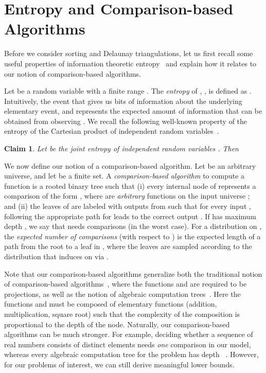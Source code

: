 \documentclass{siamltex}
\newtheorem{claim}[theorem]{Claim}
\begin{document}
\section{Entropy and Comparison-based Algorithms}\label{sec:entropy}

Before we consider sorting and Delaunay triangulations, let us first recall 
some 
useful properties of information theoretic entropy~\cite{CoverTh06} and 
explain how it relates to our notion of comparison-based algorithms.

Let  be a random variable with a finite range . The 
\emph{entropy} of , , is defined as 
.
Intuitively, the event that  gives us 
 bits of information about the underlying
elementary event, and  represents
the expected amount of information that can be obtained from observing
. We recall the following well-known property of
the entropy of the Cartesian product
of independent random variables~\cite[Theorem~2.5.1]{CoverTh06}.
\medskip
\begin{claim}\label{clm:joint} 
Let 
be the joint entropy of independent random variables .
Then  

\end{claim}

We now define our notion of a comparison-based algorithm.
Let  be an arbitrary universe, and let  be a finite set.
A \emph{comparison-based algorithm} to compute a function 
 is a rooted binary tree 
such that (i) every internal node of  represents a comparison of the 
form , where  are 
\emph{arbitrary} functions on the input universe ;
and (ii) the leaves of  are labeled with outputs from  such
that for every input , following the appropriate path for
 leads to the correct output . If  has maximum depth , we
say that  needs  comparisons (in the worst case). For a
distribution  on , the \emph{expected number of comparisons}
(with respect to ) is the expected length of a path from
the root to a leaf in , where the leaves are sampled according
to the distribution that  induces on  via .

Note that our 
comparison-based algorithms generalize both the traditional
notion of comparison-based algorithms~\cite[Chapter~8.1]{CormenLeRiSt09}, 
where the functions  and  are required to be 
projections, as well as the notion
of algebraic computation trees~\cite[Chapter~16.2]{AroraBa09}. Here the
functions  and  must be composed of elementary functions
(addition, multiplication, square root) such that the complexity  of 
the composition is proportional to the depth of the node. Naturally,
our comparison-based algorithms can be much stronger. For example,
deciding whether a sequence  of real numbers
consists of  distinct elements needs \emph{one} comparison in our model,
whereas every algebraic computation tree for the problem
has depth ~\cite[Chapter~16.2]{AroraBa09}. However,
for our problems of interest, we can still derive meaningful lower bounds.
\end{document}
